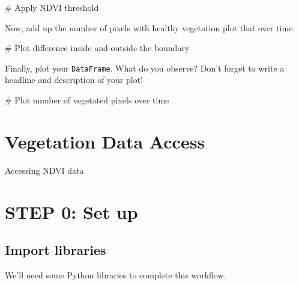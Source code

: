 \documentclass[
  letterpaper,
  DIV=11,
  numbers=noendperiod,
  oneside]{scrreprt}
\newenvironment{Shaded}{\begin{snugshade}}{\end{snugshade}}
\newcommand{\CommentTok}[1]{\textcolor[rgb]{0.37,0.37,0.37}{#1}}
\begin{document}
\begin{Shaded}
\begin{Highlighting}[]
\CommentTok{\# Apply NDVI threshold}
\end{Highlighting}
\end{Shaded}

Now, add up the number of pixels with healthy vegetation plot that over
time.

\begin{Shaded}
\begin{Highlighting}[]
\CommentTok{\# Plot difference inside and outside the boundary}
\end{Highlighting}
\end{Shaded}

Finally, plot your \texttt{DataFrame}. What do you observe? Don't forget
to write a headline and description of your plot!

\begin{Shaded}
\begin{Highlighting}[]
\CommentTok{\# Plot number of vegetated pixels over time}
\end{Highlighting}
\end{Shaded}


\chapter{Vegetation Data Access}\label{vegetation-data-access-1}

Accessing NDVI data

\hfill\break


\chapter{STEP 0: Set up}\label{step-0-set-up-3}

\section{Import libraries}\label{import-libraries-3}

We'll need some Python libraries to complete this workflow.
\end{document}
